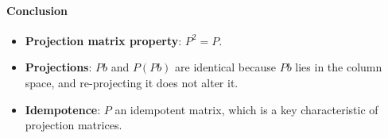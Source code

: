 \documentclass[11pt]{article}
\providecommand{\tightlist}{%
      \setlength{\itemsep}{0pt}\setlength{\parskip}{0pt}}
\begin{document}
\paragraph{\texorpdfstring{\textbf{Conclusion}}{Conclusion}}\label{conclusion}

\begin{itemize}
\tightlist
\item
  \textbf{Projection matrix property}: \(P^2 = P\).
\item
  \textbf{Projections}: \(Pb\) and \(P(Pb)\) are identical because
  \(Pb\) lies in the column space, and re-projecting it does not alter
  it.
\item
  \textbf{Idempotence}: \(P\) an idempotent matrix, which is a key
  characteristic of projection matrices.
\end{itemize}


    
    
    
\end{document}
